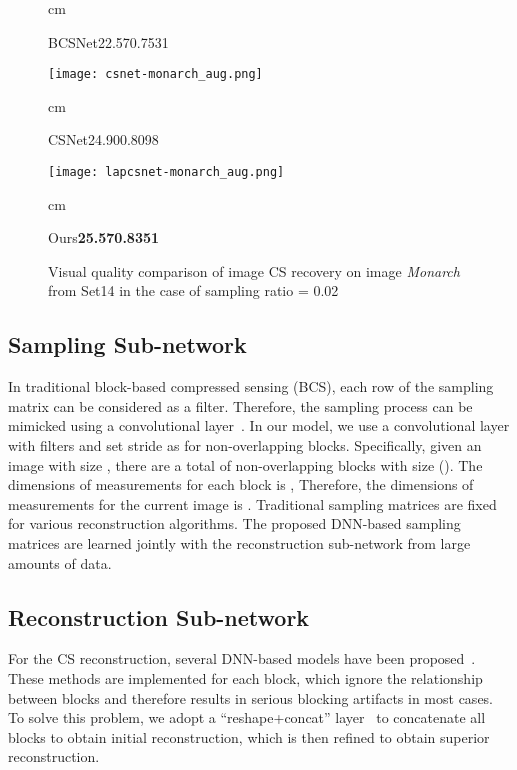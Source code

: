 \documentclass{article}
\begin{document}
\begin{figure*}[tb]
\begin{minipage}[t]{0.12\textwidth}
\begin{scriptsize}
\centering
{} cm \begin{tiny}BCSNet22.570.7531\end{tiny}
\end{scriptsize}
\end{minipage}
\hfill
\begin{minipage}[t]{0.12\textwidth}
\centering
\texttt{[image: csnet-monarch\_aug.png]}
\begin{scriptsize}
\centering
{} cm \begin{tiny}CSNet24.900.8098\end{tiny}
\end{scriptsize}
\end{minipage}
\hfill
\begin{minipage}[t]{0.12\textwidth}
\centering
\texttt{[image: lapcsnet-monarch\_aug.png]}
\begin{scriptsize}
\centering
{} cm \begin{tiny}Ours\textbf{25.57}\textbf{0.8351}\end{tiny}
\end{scriptsize}
\label{figure3}
\end{minipage}
\vspace{-0.5em} \caption{Visual quality comparison of image CS recovery on image \emph{Monarch} from Set14 in the case of sampling ratio = 0.02}
\label{figure3}
\end{figure*}



\subsection{Sampling Sub-network}
In traditional block-based compressed sensing (BCS), each row of the sampling matrix  can be considered as a filter. Therefore, the sampling process can be mimicked using a convolutional layer~\cite{adler2016deep,shi2017deep}. In our model, we use a convolutional layer with  filters and set stride as  for non-overlapping blocks. Specifically, given an image with size , there are a total of  non-overlapping blocks with size  (). The dimensions of measurements for each block is , Therefore, the dimensions of measurements for the current image is . Traditional sampling matrices are fixed for various reconstruction algorithms. The proposed DNN-based sampling matrices are learned jointly with the reconstruction sub-network from large amounts of data.
\subsection{Reconstruction Sub-network}
For the CS reconstruction, several DNN-based models have been proposed~\cite{kulkarni2016reconnet,adler2016deep}. These methods are implemented for each block, which ignore the relationship between blocks and therefore results in serious blocking artifacts in most cases. To solve this problem, we adopt a ``reshape+concat'' layer~\cite{shi2017deep} to concatenate all blocks to obtain initial reconstruction, which is then refined to obtain superior reconstruction.
\end{document}
